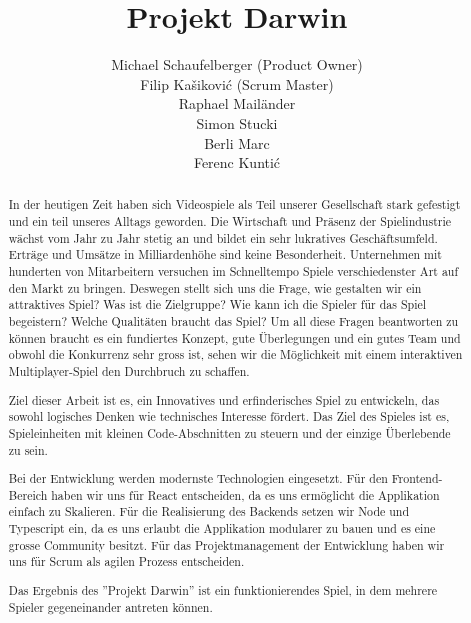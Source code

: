 \documentclass[11pt,a4paper,titlepage]{article}
\author{Michael Schaufelberger (Product Owner)\\
Filip Kašiković (Scrum Master)\\
Raphael Mailänder\\
Simon Stucki\\
Berli Marc\\
Ferenc Kuntić}
\title{Projekt Darwin}
\begin{document}
\maketitle


\begin{abstract}

In der heutigen Zeit haben sich Videospiele als Teil unserer Gesellschaft stark gefestigt und ein teil unseres Alltags geworden. Die Wirtschaft und Präsenz der Spielindustrie wächst vom Jahr zu Jahr stetig an und bildet ein sehr lukratives Geschäftsumfeld. Erträge und Umsätze in Milliardenhöhe sind keine Besonderheit. Unternehmen mit hunderten von Mitarbeitern versuchen im Schnelltempo Spiele verschiedenster Art auf den Markt zu bringen. 
Deswegen stellt sich uns die Frage, wie gestalten wir ein attraktives Spiel? Was ist die Zielgruppe? Wie kann ich die Spieler für das Spiel begeistern? Welche Qualitäten braucht das Spiel?
Um all diese Fragen beantworten zu können braucht es ein fundiertes Konzept, gute Überlegungen und ein gutes Team und obwohl die Konkurrenz sehr gross ist, sehen wir die Möglichkeit mit einem interaktiven Multiplayer-Spiel den Durchbruch zu schaffen.

Ziel dieser Arbeit ist es, ein Innovatives und erfinderisches Spiel zu entwickeln, das sowohl logisches Denken wie technisches Interesse fördert. Das Ziel des Spieles ist es, Spieleinheiten mit kleinen Code-Abschnitten zu steuern und der einzige Überlebende zu sein.

Bei der Entwicklung werden modernste Technologien eingesetzt. Für den Frontend-Bereich haben wir uns für React entscheiden, da es uns ermöglicht die Applikation einfach zu Skalieren. Für die Realisierung des Backends setzen wir Node und Typescript ein, da es uns erlaubt die Applikation modularer zu bauen und es eine grosse Community besitzt.
Für das Projektmanagement der Entwicklung haben wir uns für Scrum als agilen Prozess entscheiden.

Das Ergebnis des ''Projekt Darwin'' ist ein funktionierendes Spiel, in dem mehrere Spieler gegeneinander antreten können.

\end{abstract}
\end{document}
